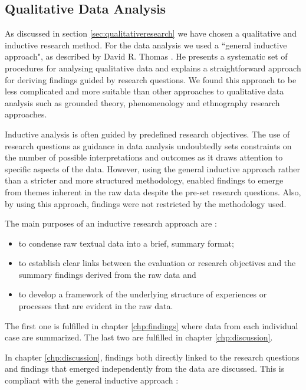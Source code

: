 \subsection{Qualitative Data Analysis}
\label{sec:qualitativeAnalysis}
As discussed in section \ref{sec:qualitativeresearch} we have chosen a qualitative and inductive research method. For the data analysis we used a ``general inductive approach", as described by David R. Thomas \cite{thomas2006general}. He presents a systematic set of procedures for analysing qualitative data and explains a straightforward approach for deriving findings guided by research questions. We found this approach to be less complicated and more suitable than other approaches to qualitative data analysis such as grounded theory, phenomenology and ethnography research approaches\cite{thorne2000data}.

Inductive analysis is often guided by predefined research objectives. The use of research questions as guidance in data analysis undoubtedly sets constraints on the number of possible interpretations and outcomes as it draws attention to specific aspects of the data. However, using the general inductive approach rather than a stricter and more structured methodology, enabled findings to emerge from themes inherent in the raw data despite the pre-set research questions. Also, by using this approach, findings were not restricted by the methodology used. 

The main purposes of an inductive research approach are \cite{thomas2006general}: 
\begin{itemize}
\item to condense raw textual data into a brief, summary format;
\item to establish clear links between the evaluation or research objectives and the summary findings derived from the raw data and
\item to develop a framework of the underlying structure  of experiences or processes that are evident in the raw data.
\end{itemize}
The first one is fulfilled in chapter \ref{chp:findings} where data from each individual case are summarized. The last two are fulfilled in chapter \ref{chp:discussion}.

In chapter \ref{chp:discussion}, findings both directly linked to the research questions and findings that emerged independently from the data are discussed. This is compliant with the general inductive approach \cite{thomas2006general}:


